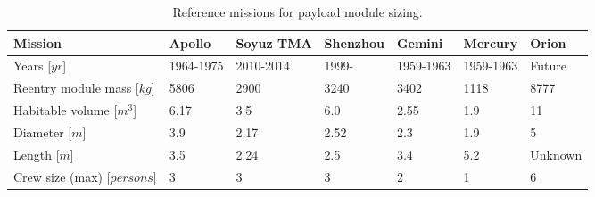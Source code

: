 \begin{table}[H]
	\caption[Reference missions for payload module sizing]{Reference missions for payload module sizing.}
		\begin{tabular}{|p{}|p{}|p{}|p{}|p{}|p{}|p{}|} %
			\hline
			Mission 						& Apollo & 	Soyuz TMA &	Shenzhou & Gemini & Mercury & Orion \\ \hline \hline
			Years [$yr$]					&	1964-1975	& 	2010-2014&	1999- &   1959-1963  & 1959-1963 & Future \\ \hline
			Reentry module mass [$kg$]  	&	5806& 	2900 &	3240 & 3402 & 1118 & 8777 \\ \hline
			Habitable volume [$m^3$]		&	6.17& 	3.5  &	6.0  & 2.55 & 1.9 & 11   \\ \hline
			Diameter [$m$]			 		&	3.9 & 	2.17  &	2.52 & 2.3 & 1.9 & 5   \\ \hline
			Length  [$m$]			 		&	3.5 & 	2.24  &	2.5  & 3.4 &  5.2 & Unknown  \\ \hline
			Crew size (max) [$persons$]		&	3   & 	3     &	3    & 2   &  1   & 6   \\ \hline
		\end{tabular}
    \label{tab:refmis}
\end{table}


